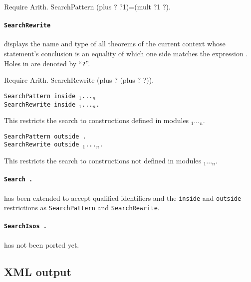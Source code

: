 \documentclass[11pt]{article}
\begin{document}
\begin{coq_example}
Require Arith.
SearchPattern (plus ? ?1)=(mult ?1 ?).
\end{coq_example}

\paragraph{{\tt SearchRewrite {\term}}}
displays the name and type of all theorems of the current
context whose statement's conclusion is an equality of which one side matches
the expression {\term}. Holes in {\term} are denoted by ``{\tt ?}''.

\begin{coq_example}
Require Arith.
SearchRewrite (plus ? (plus ? ?)).
\end{coq_example}

\begin{Variants}

\item {\tt SearchPattern {\term} inside {\module$_1$}...{\module$_n$}}\\
{\tt SearchRewrite {\term} inside
{\module$_1$}...{\module$_n$}.}

  This restricts the search to constructions defined in modules {\module$_1$}...{\module$_n$}.

\item {\tt SearchPattern {\term} outside {\module}.}\\
{\tt SearchRewrite {\term} outside {\module$_1$}...{\module$_n$}.}

  This restricts the search to constructions not defined in modules {\module$_1$}...{\module$_n$}.

\end{Variants}

\paragraph{{\tt Search {\ident}.}} has been extended to accept qualified
identifiers and the {\tt inside} and {\tt outside} restrictions as
{\tt SearchPattern} and {\tt SearchRewrite}.

\paragraph{{\tt SearchIsos {\term}.}} has not been ported yet.

\subsection{XML output}
\label{XML}
\end{document}
